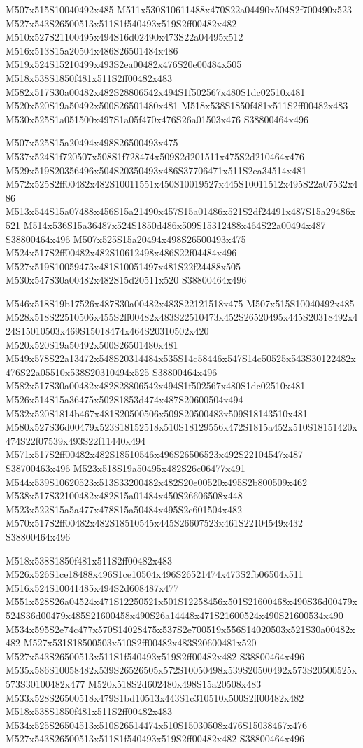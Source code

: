 \documentclass{article}
\begin{document}
\begin{multicols}{2}
M507x515S10040492x485 M511x530S10611488x470S22a04490x504S2f700490x523 M527x543S26500513x511S1f540493x519S2ff00482x482 M510x527S21100495x494S16d02490x473S22a04495x512 M516x513S15a20504x486S26501484x486 M519x524S15210499x493S2ea00482x476S20e00484x505 M518x538S1850f481x511S2ff00482x483 M582x517S30a00482x482S28806542x494S1f502567x480S1dc02510x481 M520x520S19a50492x500S26501480x481 M518x538S1850f481x511S2ff00482x483 M530x525S1a051500x497S1a05f470x476S26a01503x476 S38800464x496

M507x525S15a20494x498S26500493x475 M537x524S1f720507x508S1f728474x509S2d201511x475S2d210464x476 M529x519S20356496x504S20350493x486S37706471x511S2ea34514x481 M572x525S2ff00482x482S10011551x450S10019527x445S10011512x495S22a07532x486 M513x544S15a07488x456S15a21490x457S15a01486x521S2df24491x487S15a29486x521 M514x536S15a36487x524S1850d486x509S15312488x464S22a00494x487 S38800464x496 M507x525S15a20494x498S26500493x475 M524x517S2ff00482x482S10612498x486S22f04484x496 M527x519S10059473x481S10051497x481S22f24488x505 M530x547S30a00482x482S15d20511x520 S38800464x496

M546x518S19b17526x487S30a00482x483S22121518x475 M507x515S10040492x485 M528x518S22510506x455S2ff00482x483S22510473x452S26520495x445S20318492x424S15010503x469S15018474x464S20310502x420 M520x520S19a50492x500S26501480x481 M549x578S22a13472x548S20314484x535S14c58446x547S14c50525x543S30122482x476S22a05510x538S20310494x525 S38800464x496 M582x517S30a00482x482S28806542x494S1f502567x480S1dc02510x481 M526x514S15a36475x502S1853d474x487S20600504x494 M532x520S1814b467x481S20500506x509S20500483x509S18143510x481 M580x527S36d00479x523S18152518x510S18129556x472S1815a452x510S18151420x474S22f07539x493S22f11440x494 M571x517S2ff00482x482S18510546x496S26506523x492S22104547x487 S38700463x496 M523x518S19a50495x482S26c06477x491 M544x539S10620523x513S33200482x482S20e00520x495S2b800509x462 M538x517S32100482x482S15a01484x450S26606508x448 M523x522S15a5a477x478S15a50484x495S2c601504x482 M570x517S2ff00482x482S18510545x445S26607523x461S22104549x432 S38800464x496

M518x538S1850f481x511S2ff00482x483 M526x526S1ce18488x496S1ce10504x496S26521474x473S2fb06504x511 M516x524S10041485x494S2d608487x477 M551x528S26a04524x471S12250521x501S12258456x501S21600468x490S36d00479x524S36d00479x485S21600458x490S26a14448x471S21600524x490S21600534x490 M534x595S2e74c477x570S14028475x537S2e700519x556S14020503x521S30a00482x482 M527x531S18500503x510S2ff00482x483S20600481x520 M527x543S26500513x511S1f540493x519S2ff00482x482 S38800464x496 M535x586S10058482x539S26526505x572S10050498x539S20500492x573S20500525x573S30100482x477 M520x518S2d602480x498S15a20508x483 M533x528S26500518x479S1bd10513x443S1c310510x500S2ff00482x482 M518x538S1850f481x511S2ff00482x483 M534x525S26504513x510S26514474x510S15030508x476S15038467x476 M527x543S26500513x511S1f540493x519S2ff00482x482 S38800464x496


\end{multicols}
\end{document}
